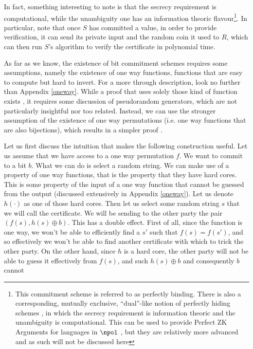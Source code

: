 \documentclass{article}
\begin{document}
In fact, something interesting to note is that the secrecy requirement is computational, while the unambiguity one has an information theoric flavour\footnote{This commitment scheme is referred to as perfectly binding. There is also a corresponding, mutually exclusive, \enquote{dual}-like notion of perfectly hiding  schemes \cite{brassardMinimumDisclosureProofs1988}, in which the secrecy
    requirement is information theoric and the unambiguity is computational. This can be used to provide Perfect ZK Arguments for
    languages in $\npol$ \cite{naorPerfectZeroKnowledgeArguments1998}, but they are relatively more advanced and as such will not be discussed here}.
In particular, note that once $S$ has committed a value, in order to provide verification, it can send its private input and the random coin it used to $R$, which can then
run $S$'s algorithm to verify the certificate in polynomial time. \par
As far as we know, the existence of bit commitment schemes requires some assumptions, namely the existence of one way functions, functions that are easy to compute but hard to invert.
For a more through description, look no further than Appendix \ref{oneway}.
While a proof that uses solely those kind of function exists \cite{naorBitCommitmentUsing}, it requires some discussion of pseudorandom generators, which are not particularly insightful nor too related.
Instead, we can use the stronger assumption of the existence of one way permutations (i.e. one way functions that are also bijections), which results in a simpler proof \cite{blummanuelCoinFlippingTelephone1983}.\par
Let us first discuss the intuition that makes the following construction useful. Let us assume that we have access to a one way permutation $f$.
We want to commit to a bit $b$. What we can do is select a random string. We can make use of a property of one way functions, that is the
property that they have hard cores. This is some property of the input of a one way function that cannot be guessed from the output (discussed extensively in Appendix \ref{oneway}).
Let us denote $h(\cdot)$ as one of those hard cores. Then let us select some random string $s$ that we will call the certificate. We will be sending to
the other party the pair $(f(s), h(s) \oplus b)$. This has a double effect. First of all, since the function is one way, we won't be able to
efficiently find a $s'$ such that $f(s) = f(s')$, and so effectively we won't be able to find another certificate with which to trick the other party.
On the other hand, since $h$ is a hard core, the other party will not be able to guess it effectively from $f(s)$, and such $h(s) \oplus b$ and consequently $b$ cannot
\end{document}

